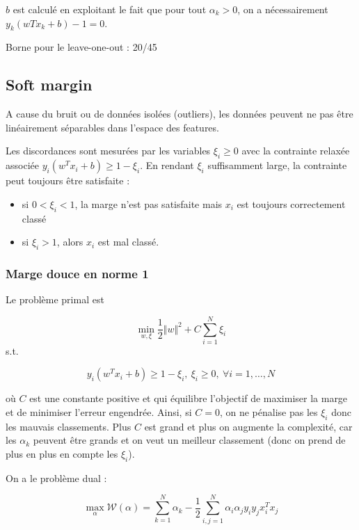 	$b$ est calculé en exploitant le fait que pour tout $\alpha_k > 0$, on a nécessairement $y_k(wTx_k + b) - 1 = 0$.
	
	Borne pour le leave-one-out : 20/45
	
	\subsection{Soft margin}
	
	A cause du bruit ou de données isolées (outliers), les données peuvent ne pas être linéairement séparables dans l'espace des features. 
	
	
	Les discordances sont mesurées par les variables $\xi_i \geq 0$ avec la contrainte relaxée associée $y_i(w^Tx_i + b) \geq 1 - \xi_i$. En rendant $\xi_i$ suffisamment large, la contrainte peut toujours être satisfaite :
	
	\begin{itemize}
		\item si $0 < \xi_i < 1$, la marge n'est pas satisfaite mais $x_i$ est toujours correctement classé
		\item si $\xi_i > 1$, alors $x_i$ est mal classé.
	\end{itemize}
	
	\subsubsection{Marge douce en norme 1}
	
	Le problème primal est
	
	$$\min_{w, \xi} \frac{1}{2} \Vert w \Vert^2 + C \sum_{i = 1}^N \xi_i$$
	s.t.
	
	$$y_i(w^T x_i + b) \geq 1 - \xi_i, \: \xi_i \geq 0, \: \forall i = 1, \dots , N$$
	
	où $C$ est une constante positive et qui équilibre l'objectif de maximiser la marge et de minimiser l'erreur engendrée. Ainsi, si $C = 0$, on ne pénalise pas les $\xi_i$ donc les mauvais classements. Plus $C$ est grand et plus on augmente la complexité, car les $\alpha_k$ peuvent être grands et on veut un meilleur classement (donc on prend de plus en plus en compte les $\xi_i$).
	
	
	On a le problème dual :
	
	$$\max_\alpha \mathcal{W}(\alpha) = \sum_{k = 1}^N \alpha_k - \frac{1}{2} \sum_{i, j = 1}^N \alpha_i \alpha_j y_i y_j x_i^T x_j$$
	
